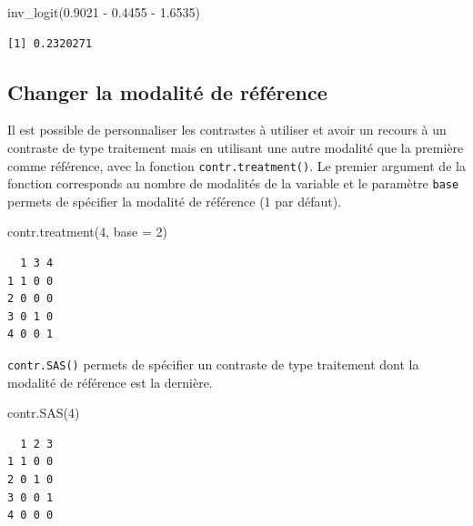 \documentclass[
  letterpaper,
  DIV=11,
  numbers=noendperiod,
  oneside]{scrreprt}
\newenvironment{Shaded}{\begin{snugshade}}{\end{snugshade}}
\newcommand{\AttributeTok}[1]{\textcolor[rgb]{0.40,0.45,0.13}{#1}}
\newcommand{\DecValTok}[1]{\textcolor[rgb]{0.68,0.00,0.00}{#1}}
\newcommand{\FloatTok}[1]{\textcolor[rgb]{0.68,0.00,0.00}{#1}}
\newcommand{\FunctionTok}[1]{\textcolor[rgb]{0.28,0.35,0.67}{#1}}
\newcommand{\NormalTok}[1]{\textcolor[rgb]{0.00,0.23,0.31}{#1}}
\newcommand{\SpecialCharTok}[1]{\textcolor[rgb]{0.37,0.37,0.37}{#1}}
\begin{document}
\begin{Shaded}
\begin{Highlighting}[]
\FunctionTok{inv\_logit}\NormalTok{(}\FloatTok{0.9021} \SpecialCharTok{{-}} \FloatTok{0.4455} \SpecialCharTok{{-}} \FloatTok{1.6535}\NormalTok{)}
\end{Highlighting}
\end{Shaded}

\begin{verbatim}
[1] 0.2320271
\end{verbatim}

\hypertarget{changer-la-modalituxe9-de-ruxe9fuxe9rence}{%
\subsection{Changer la modalité de
référence}\label{changer-la-modalituxe9-de-ruxe9fuxe9rence}}

Il est possible de personnaliser les contrastes à utiliser et avoir un
recours à un contraste de type traitement mais en utilisant une autre
modalité que la première comme référence, avec la fonction
\texttt{contr.treatment()}. Le premier argument de la fonction
corresponds au nombre de modalités de la variable et le paramètre
\texttt{base} permets de spécifier la modalité de référence (1 par
défaut).

\begin{Shaded}
\begin{Highlighting}[]
\FunctionTok{contr.treatment}\NormalTok{(}\DecValTok{4}\NormalTok{, }\AttributeTok{base =} \DecValTok{2}\NormalTok{)}
\end{Highlighting}
\end{Shaded}

\begin{verbatim}
  1 3 4
1 1 0 0
2 0 0 0
3 0 1 0
4 0 0 1
\end{verbatim}

\texttt{contr.SAS()} permets de spécifier un contraste de type
traitement dont la modalité de référence est la dernière.

\begin{Shaded}
\begin{Highlighting}[]
\FunctionTok{contr.SAS}\NormalTok{(}\DecValTok{4}\NormalTok{)}
\end{Highlighting}
\end{Shaded}

\begin{verbatim}
  1 2 3
1 1 0 0
2 0 1 0
3 0 0 1
4 0 0 0
\end{verbatim}
\end{document}
